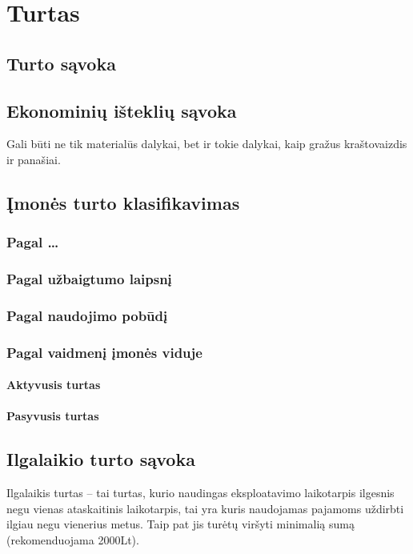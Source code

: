 \chapter{Turtas}

\section{Turto sąvoka}

\section{Ekonominių išteklių sąvoka}

Gali būti ne tik materialūs dalykai, bet ir tokie dalykai, kaip
gražus kraštovaizdis ir panašiai.

\section{Įmonės turto klasifikavimas}

\subsection{Pagal …}
\subsection{Pagal užbaigtumo laipsnį}
\subsection{Pagal naudojimo pobūdį}
\subsection{Pagal vaidmenį įmonės viduje}
\subsubsection{Aktyvusis turtas}
\subsubsection{Pasyvusis turtas}
\section{Ilgalaikio turto sąvoka}

Ilgalaikis turtas – tai turtas, kurio naudingas eksploatavimo
laikotarpis ilgesnis negu vienas ataskaitinis laikotarpis,
tai yra kuris naudojamas pajamoms uždirbti ilgiau negu
vienerius metus. Taip pat jis turėtų viršyti minimalią sumą
(rekomenduojama 2000Lt).

